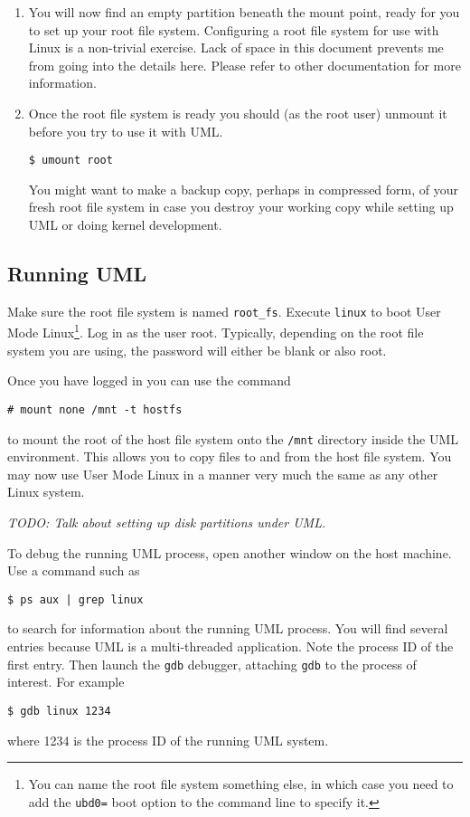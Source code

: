 \documentclass{article}
\newcommand{\command}[1]{\texttt{#1}}    %
\newcommand{\filename}[1]{\texttt{#1}}   %
\newcommand{\todo}[1]{\textit{TODO: #1}}
\begin{document}
\begin{enumerate}
\item You will now find an empty partition beneath the mount point, ready for you to set up your
  root file system. Configuring a root file system for use with Linux is a non-trivial exercise.
  Lack of space in this document prevents me from going into the details here. Please refer to
  other documentation for more information.

\item Once the root file system is ready you should (as the root user) unmount it before you try
  to use it with UML.
\begin{verbatim}
$ umount root
\end{verbatim}
  You might want to make a backup copy, perhaps in compressed form, of your fresh root file
  system in case you destroy your working copy while setting up UML or doing kernel development.

\end{enumerate}

\subsection{Running UML}

Make sure the root file system is named \filename{root\_fs}. Execute \command{linux} to boot
User Mode Linux\footnote{You can name the root file system something else, in which case you
  need to add the \texttt{ubd0=} boot option to the command line to specify it.}. Log in as the
user root. Typically, depending on the root file system you are using, the password will either
be blank or also root.

Once you have logged in you can use the command
\begin{verbatim}
# mount none /mnt -t hostfs
\end{verbatim}
to mount the root of the host file system onto the \filename{/mnt} directory inside the UML
environment. This allows you to copy files to and from the host file system. You may now use
User Mode Linux in a manner very much the same as any other Linux system.

\todo{Talk about setting up disk partitions under UML.}

To debug the running UML process, open another window on the host machine. Use a command such as
\begin{verbatim}
$ ps aux | grep linux
\end{verbatim}
to search for information about the running UML process. You will find several entries because
UML is a multi-threaded application. Note the process ID of the first entry. Then launch the
\command{gdb} debugger, attaching \command{gdb} to the process of interest. For example
\begin{verbatim}
$ gdb linux 1234
\end{verbatim}
where 1234 is the process ID of the running UML system.
\end{document}
